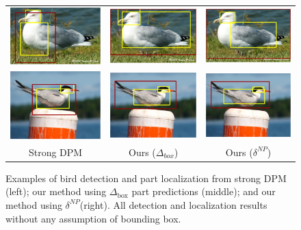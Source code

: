 \begin{figure}
\begin{center}
\begin{tabular}{ccc}
\includegraphics[width=0.3\linewidth]{16_strong_dpm.jpg} &
\includegraphics[width=0.3\linewidth]{16_individual.jpg} &
\includegraphics[width=0.3\linewidth]{16_neighbor.jpg} \\
\includegraphics[width=0.3\linewidth]{17_strong_dpm.jpg} &
\includegraphics[width=0.3\linewidth]{17_individual.jpg} &
\includegraphics[width=0.3\linewidth]{17_neighbor.jpg} \\
Strong DPM & Ours ($\Delta_{box}$) & Ours ($\delta^{NP}$)
\\
\end{tabular}
\end{center}
\caption{{Examples of bird detection and part localization from strong DPM~\cite{Hossein_ECCV12} (left); our method using $\Delta_{\mathrm{box}}$ part predictions (middle); and our method using $\delta^{NP}$(right). All detection and localization results without any assumption of bounding box. }}
\label{fig:comparasion}
\end{figure}

